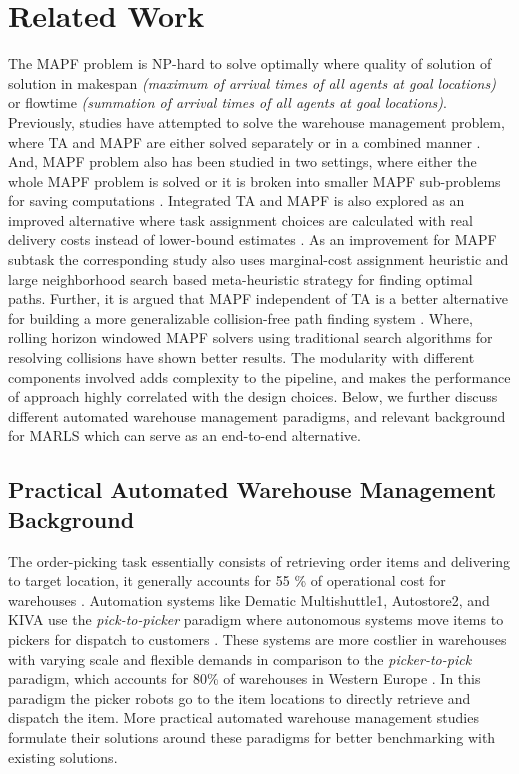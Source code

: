 \documentclass{article}
\begin{document}
\section{Related Work}


The MAPF problem is NP-hard to solve optimally where quality of solution of solution in makespan \textit{(maximum of arrival times of all agents at goal locations)} or flowtime \textit{(summation of arrival times of all agents at goal locations)}.
Previously, studies have attempted to solve the warehouse management problem, where TA and MAPF are either solved separately or in a combined manner \cite{korsah2013comprehensive}.
And, MAPF problem also has been studied in two settings, where either the whole MAPF problem is solved or it is broken into smaller MAPF sub-problems for saving computations \cite{stern2019multi}.
Integrated TA and MAPF is also explored as an improved alternative where task assignment choices are calculated with real delivery costs instead of lower-bound estimates \cite{chen2021integrated}.
As an improvement for MAPF subtask the corresponding study also uses marginal-cost assignment heuristic and large neighborhood search based meta-heuristic strategy for finding optimal paths.
Further, it is argued that MAPF independent of TA is a better alternative for building a more generalizable collision-free path finding system \cite{li2021lifelong}.
Where, rolling horizon windowed MAPF solvers using traditional search algorithms for resolving collisions have shown better results.
The modularity with different components involved adds complexity to the pipeline, and makes the performance of approach highly correlated with the design choices.
Below, we further discuss different automated warehouse management paradigms, and relevant background for MARLS which can serve as an end-to-end alternative.


\subsection{Practical Automated Warehouse Management Background} \label{warehouse-problem-background}


The order-picking task essentially consists of retrieving order items and delivering to target location, it generally accounts for 55 \% of operational cost for warehouses \cite{drury1988towards}.
Automation systems like Dematic Multishuttle1, Autostore2, and KIVA use the \textit{pick-to-picker} paradigm where autonomous systems move items to pickers for dispatch to customers \cite{wurman2008coordinating}.
These systems are more costlier in warehouses with varying scale and flexible demands in comparison to the \textit{picker-to-pick} paradigm, which accounts for 80\% of warehouses in Western Europe \cite{de2007design}.
In this paradigm the picker robots go to the item locations to directly retrieve and dispatch the item.
More practical automated warehouse management studies formulate their solutions around these paradigms for better benchmarking with existing solutions.
\end{document}

